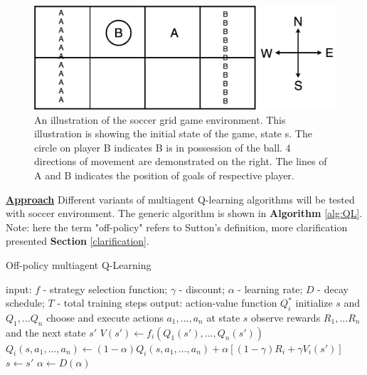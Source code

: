 \documentclass[10pt]{article}
\begin{document}
\begin{figure}[h!]
  \centering
  \includegraphics[width=0.65\linewidth]{diagram/soccer.png}
    \caption{An illustration of the soccer grid game environment. This illustration is showing the initial state of the game, state s. The circle on player B indicates B is in possession of the ball. 4 directions of movement are demonstrated on the right. The lines of A and B indicates the position of goals of respective player.}
  \label{fig:soccer}
\end{figure}

\bigbreak
\noindent
\ul{\textbf{Approach}} Different variants of multiagent Q-learning algorithms will be tested with soccer environment. The generic algorithm\cite{GreenwaldCorrelatedQLearning2003} is shown in \textbf{Algorithm} \ref{alg:QL}. Note: here the term "off-policy" refers to Sutton's definition, more clarification presented \textbf{Section} \ref{clarification}.

\begin{algorithm}
\caption{Off-policy multiagent Q-Learning}\label{alg:QL}
\begin{algorithmic}
\STATE input: $f$ - strategy selection function; $\gamma$ - discount; $\alpha$ - learning rate; $D$ - decay schedule; $T$ - total training steps
\STATE output: action-value function $Q_i^*$
\STATE initialize $s$ and $Q_1,...Q_n$
\STATE choose and execute actions $a_1,...,a_n$ at state $s$
\STATE observe rewards $R_1,...R_n$ and the next state $s'$
\STATE $V(s')\leftarrow f_i(Q_1(s'),...,Q_n(s'))$
\STATE $Q_i(s,a_1,...,a_n)\leftarrow(1-\alpha)Q_i(s,a_1,...,a_n)+\alpha[(1-\gamma)R_i+\gamma V_i(s')]$
\ENDFOR
\STATE $s\leftarrow s'$
\STATE $\alpha\leftarrow D(\alpha)$
\ENDFOR
\end{algorithmic}
\end{algorithm}
\end{document}
